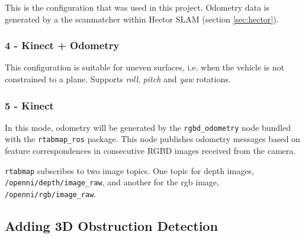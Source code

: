 This is the configuration that was used in this project. Odometry data is generated by a the scanmatcher within Hector SLAM (section \ref{sec:hector}). 

\subsubsection{4 - Kinect + Odometry}

This configuration is suitable for uneven surfaces, i.e. when the vehicle is not constrained to a plane. Supports \textit{roll}, \textit{pitch} and \textit{yaw} rotations.

\subsubsection{5 - Kinect}

In this mode, odometry will be generated by the \texttt{rgbd\_odometry} node bundled with the \texttt{rtabmap\_ros} package. This node publishes odometry messages based on feature correspondences in consecutive RGBD images received from the camera.


\texttt{rtabmap} subscribes to two image topics. One topic for depth images, \texttt{/openni/depth/image\_raw}, and another for the rgb image, \texttt{/openni/rgb/image\_raw}. 

\subsection{Adding 3D Obstruction Detection}

